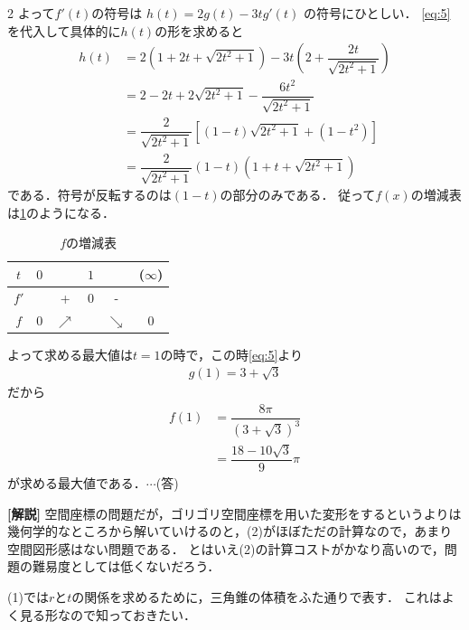 \documentclass[../../main.tex]{subfiles}
\begin{document}
\begin{multicols}{2}
  よって$f'(t)$の符号は $h(t)=2 g(t) - 3t g'(t)$ の符号にひとしい．
  \cref{eq:5}を代入して具体的に$h(t)$の形を求めると
  \begin{align}
    h(t) & = 2(1+2t+\sqrt{2t^2+1}) - 3t\left(2 + \dfrac{2t}{\sqrt{2t^2+1}}\right)   \\
    & = 2-2t + 2\sqrt{2t^2+1} - \dfrac{6t^2}{\sqrt{2t^2+1}}                    \\
    & = \dfrac{2}{\sqrt{2t^2+1}} \left[ (1-t)\sqrt{2t^2+1} + (1-t^2)\right]    \\
    & = \dfrac{2}{\sqrt{2t^2+1}}\left(1-t\right)\left(1+t+\sqrt{2t^2+1}\right)
  \end{align}
  である．符号が反転するのは$(1-t)$の部分のみである．
  従って$f(x)$の増減表は\cref{2011-1:table:1}のようになる．
  \begin{table}[H]
    \centering
    \caption{$f$の増減表}
    \label{2011-1:table:1}
    \begin{tabular}{|c||c|c|c|c|c|}
      \hline
      $t$  & $0$ &            & $1$ &            & ($\infty$) \\
      \hline
      $f'$ &     & +          & $0$ & -          &            \\
      \hline
      $f$  & $0$ & $\nearrow$ &     & $\searrow$ & $0$        \\
      \hline
    \end{tabular}
  \end{table}
  よって求める最大値は$t=1$の時で，この時\cref{eq:5}より
  \begin{align}
    g(1)=3+\sqrt{3}
  \end{align}
  だから
  \begin{align}
    f(1)
    & = \dfrac{8\pi}{(3+\sqrt{3})^3} \\
    & = \dfrac{18-10\sqrt{3}}{9}\pi
  \end{align}
  が求める最大値である．$\cdots$(答)

  {\bf [解説]}
  空間座標の問題だが，ゴリゴリ空間座標を用いた変形をするというよりは幾何学的なところから解いていけるのと，(2)がほぼただの計算なので，あまり空間図形感はない問題である．
  とはいえ(2)の計算コストがかなり高いので，問題の難易度としては低くないだろう．

  (1)では$r$と$t$の関係を求めるために，三角錐の体積をふた通りで表す．
  これはよく見る形なので知っておきたい．


\end{multicols}
\end{document}
